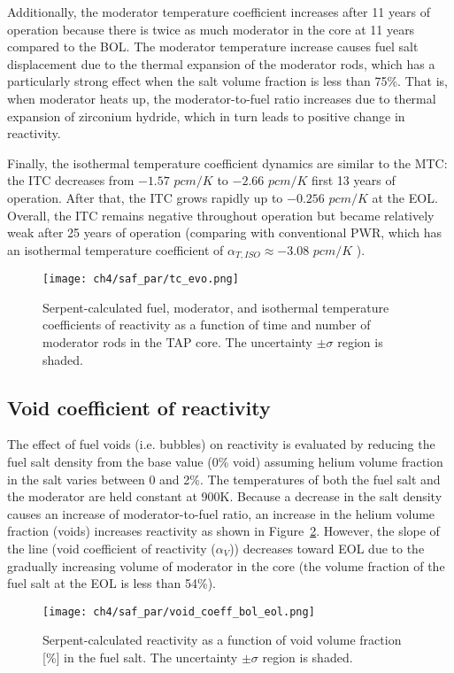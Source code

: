 Additionally, the moderator temperature coefficient increases after 11 years 
of operation because there is twice as much moderator in the core at 11 years 
compared to the \gls{BOL}. The moderator temperature increase causes fuel 
salt displacement due to the thermal expansion of the moderator rods, which 
has a particularly strong effect when the salt volume fraction is less than 
75\%. That is, when moderator heats up, the moderator-to-fuel ratio increases 
due to thermal expansion of zirconium hydride, which in turn leads to positive 
change in reactivity. %

Finally, the isothermal temperature coefficient dynamics are similar to the 
MTC:
the ITC decreases from $-1.57$ $pcm/K$ to $-2.66$ $pcm/K$ first 13 years of 
operation. After that, the ITC grows rapidly up to $-0.256$ $pcm/K$ at the 
\gls{EOL}. Overall, the ITC remains negative throughout operation but became 
relatively weak after 25 years of operation (comparing with conventional 
\gls{PWR}, which has an isothermal temperature coefficient of 
$\alpha_{T,ISO}\approx-3.08$ $pcm/K$ \cite{forget_integral_2018}).
\begin{figure}[htp!] %
	\centering
	\texttt{[image: ch4/saf\_par/tc\_evo.png]}
	\caption{Serpent-calculated fuel, moderator, and isothermal temperature 
		coefficients of reactivity as a function of time and number of 
		moderator 
		rods in the \gls{TAP} core. The uncertainty $\pm\sigma$ region is 
		shaded.}
	\label{fig:tc-evo}
\end{figure}

\subsection{Void coefficient of reactivity}
The effect of fuel voids (i.e. bubbles) on reactivity is evaluated by reducing 
the fuel salt density from the base value (0\% void) assuming helium volume 
fraction in the salt varies between 0 and 2\%. The temperatures of both the 
fuel salt and the moderator are held constant at 900K. 
Because a decrease in the salt density causes an increase of moderator-to-fuel 
ratio, an increase in the helium volume fraction (voids) increases reactivity 
as shown in Figure~\ref{fig:void-bol-eol}.
However, the slope of the line (void coefficient of reactivity ($\alpha_{V}$)) 
decreases toward \gls{EOL} due to the gradually increasing volume of moderator 
in the core (the volume fraction of the fuel salt at the \gls{EOL} is less 
than 54\%).
\begin{figure}[htp!] %
	\centering
	\texttt{[image: ch4/saf\_par/void\_coeff\_bol\_eol.png]}
	\vspace{-4mm}
	\caption{Serpent-calculated reactivity as a function of void volume 
		fraction [\%] in the fuel salt. The uncertainty $\pm\sigma$ region is 
		shaded.}
	\label{fig:void-bol-eol}
\end{figure}

